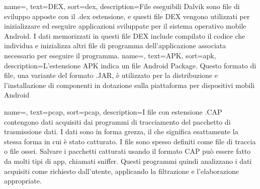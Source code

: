 {
    name=,
    text=DEX,
    sort=dex,
    description={File eseguibili Dalvik sono file di sviluppo apposte con il .dex estensione, e questi file DEX vengono utilizzati per inizializzare ed eseguire applicazioni sviluppate per il sistema operativo mobile Android.
    I dati memorizzati in questi file DEX include compilato il codice che individua e inizializza altri file di programma dell'applicazione associata necessario per eseguire il programma.}
}
{
    name=,
    text=APK,
    sort=apk,
    description={L'estensione APK indica un file Android Package. Questo formato di file, una variante del formato .JAR, è utilizzato per la distribuzione e l'installazione di componenti in dotazione sulla piattaforma per dispositivi mobili Android}
}

{
    name=,
    text=pcap,
    sort=pcap,
    description={I file con estensione .CAP contengono dati acquisiti dai programmi di tracciamento del pacchetto di trasmissione dati. I dati sono in forma grezza, il che significa esattamente la stessa forma in cui è stato catturato.
    I file sono spesso definiti come file di traccia o file ossei. Salvare i pacchetti catturati usando il formato CAP può essere fatto da molti tipi di app, chiamati sniffer. Questi programmi quindi analizzano i dati acquisiti come richiesto dall'utente, applicando la filtrazione e l'elaborazione appropriate.}
}

